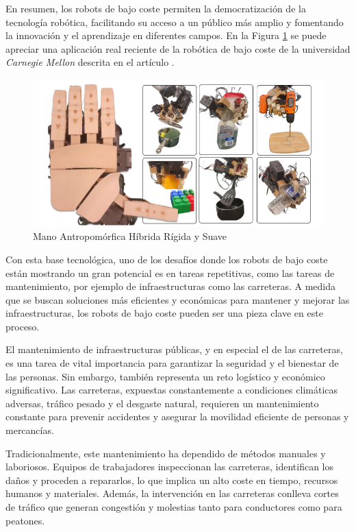 En resumen, los robots de bajo coste permiten la democratización de la tecnología robótica, facilitando su acceso a un público más amplio y fomentando la innovación y el aprendizaje en diferentes campos. En la Figura \ref{fig:roblowcost} se puede apreciar una aplicación real reciente de la robótica de bajo coste de la universidad \textit{Carnegie Mellon} descrita en el artículo \cite{shaw2024leap}.

\begin{figure} [h!]
	\begin{center}
		\includegraphics[width=16cm]{figs/handlowcost.png}
	\end{center}
	\caption{Mano Antropomórfica Híbrida Rígida y Suave} %
	\label{fig:roblowcost}
\end{figure}

Con esta base tecnológica, uno de los desafíos donde los robots de bajo coste están mostrando un gran potencial es en tareas repetitivas, como las tareas de mantenimiento, por ejemplo de infraestructuras como las carreteras. A medida que se buscan soluciones más eficientes y económicas para mantener y mejorar las infraestructuras, los robots de bajo coste pueden ser una pieza clave en este proceso.

El mantenimiento de infraestructuras públicas, y en especial el de las carreteras, es una tarea de vital importancia para garantizar la seguridad y el bienestar de las personas. Sin embargo, también representa un reto logístico y económico significativo. Las carreteras, expuestas constantemente a condiciones climáticas adversas, tráfico pesado y el desgaste natural, requieren un mantenimiento constante para prevenir accidentes y asegurar la movilidad eficiente de personas y mercancías.

Tradicionalmente, este mantenimiento ha dependido de métodos manuales y laboriosos. Equipos de trabajadores inspeccionan las carreteras, identifican los daños y proceden a repararlos, lo que implica un alto coste en tiempo, recursos humanos y materiales. Además, la intervención en las carreteras conlleva cortes de tráfico que generan congestión y molestias tanto para conductores como para peatones.

